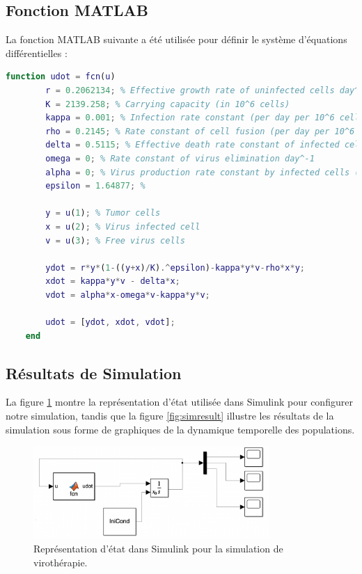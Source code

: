 \documentclass{article}
\begin{document}
\subsection{Fonction MATLAB}
La fonction MATLAB suivante a été utilisée pour définir le système d'équations différentielles :

\begin{lstlisting}[language=Matlab, caption={Fonction MATLAB pour la simulation de virothérapie.}, label={lst:matlab_code}]
    function udot = fcn(u)
        r = 0.2062134; % Effective growth rate of uninfected cells day^-1
        K = 2139.258; % Carrying capacity (in 10^6 cells)
        kappa = 0.001; % Infection rate constant (per day per 10^6 cells or virions)
        rho = 0.2145; % Rate constant of cell fusion (per day per 10^6 cells)
        delta = 0.5115; % Effective death rate constant of infected cells day^-1
        omega = 0; % Rate constant of virus elimination day^-1
        alpha = 0; % Virus production rate constant by infected cells (virions per day per cell)
        epsilon = 1.64877; % 
        
        y = u(1); % Tumor cells 
        x = u(2); % Virus infected cell 
        v = u(3); % Free virus cells
        
        ydot = r*y*(1-((y+x)/K).^epsilon)-kappa*y*v-rho*x*y;
        xdot = kappa*y*v - delta*x;
        vdot = alpha*x-omega*v-kappa*y*v;
        
        udot = [ydot, xdot, vdot];
    end
\end{lstlisting}

\subsection{Résultats de Simulation}
La figure \ref{fig:simstate} montre la représentation d'état utilisée dans Simulink pour configurer notre simulation, tandis que la figure \ref{fig:simresult} illustre les résultats de la simulation sous forme de graphiques de la dynamique temporelle des populations.

\begin{figure}[H]
\centering
\includegraphics[width=0.8\textwidth]{src/state_representation.png}
\caption{Représentation d'état dans Simulink pour la simulation de virothérapie.}
\label{fig:simstate}
\end{figure}
\end{document}
